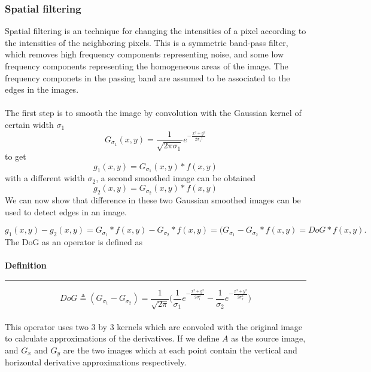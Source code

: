 \subsubsection{Spatial filtering}
Spatial filtering is an technique for changing the intensities of a pixel according to the intensities of the neighboring pixels.
This is a symmetric band-pass filter, which removes high frequency components representing noise, and some low frequency components representing the homogeneous areas of the image. The frequency componets in the passing band are assumed to be associated to the edges in the images.
\\\\
The first step is to smooth the image by convolution with the Gaussian kernel of certain width ${\sigma_{1}}$
\[
G_{\sigma_{1}}(x,y) = \frac{1}{\sqrt{2\pi{\sigma_{1}}}}e^{-\frac{x^2+y^2}{2{\sigma_{1}}^2}}
\]
to get
\[
g_1(x,y) = G_{\sigma_{1}}(x,y) * f(x,y)
\]
with a different width ${\sigma_{2}}$, a second smoothed image can be obtained
\[
g_2(x,y) = G_{\sigma_{2}}(x,y) * f(x,y)
\]
We can now show that difference in these two Gaussian smoothed images can be used to detect edges in an image.

\[
g_1(x,y) - g_2(x,y) = G_{\sigma_1} * f(x,y) - G_{\sigma_2} * f(x,y) = (G_{\sigma_1} - G_{\sigma_2} * f(x,y) = DoG*f(x,y).
\]
The DoG as an operator is defined as \\\\
\textbf{Definition}
\smallskip
\hrule
\bigskip
\[
DoG \triangleq (G_{\sigma_1} - G_{\sigma_2}) = \frac{1}{\sqrt{2\pi}}\big(\frac{1}{\sigma_1}e^{-\frac{x^2+y^2}{2\sigma_1^2}}- \frac{1}{\sigma_2}e^{-\frac{x^2+y^2}{2\sigma_2^2}}\big) 
\]
\\
This operator uses two 3 by 3 kernels which are convoled with the original image to calculate approximations of the derivatives. If we define $A$ as the source image, and $G_x$ and $G_y$ are the two images which at each point contain the vertical and horizontal derivative approximations respectively. 

